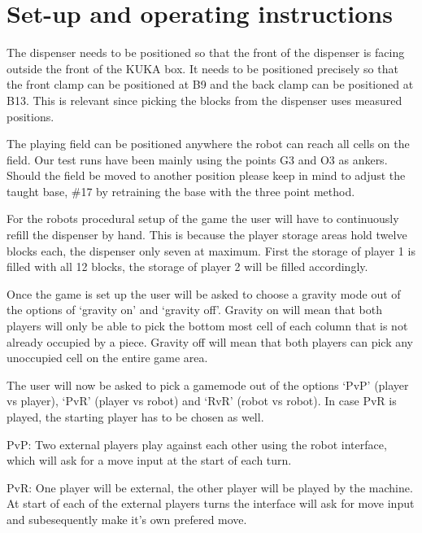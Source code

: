 \documentclass{article}
\begin{document}
    \makeHeader\newpage
    \tableofcontents
    \newpage
    \section{Set-up and operating instructions}
        The dispenser needs to be positioned so that the front of the dispenser is facing outside the front of the KUKA box. It needs to be positioned precisely so that the front clamp can be positioned at B9 and the back clamp can be positioned at B13. This is relevant since picking the blocks from the dispenser uses measured positions.
        
        The playing field can be positioned anywhere the robot can reach all cells on the field. Our test runs have been mainly using the points G3 and O3 as ankers. Should the field be moved to another position please keep in mind to adjust the taught base, \#17 by retraining the base with the three point method. 

        For the robots procedural setup of the game the user will have to continuously refill the dispenser by hand. This is because the player storage areas hold twelve blocks each, the dispenser only seven at maximum. First the storage of player 1 is filled with all 12 blocks, the storage of player 2 will be filled accordingly.

        Once the game is set up the user will be asked to choose a gravity mode out of the options of `gravity on' and `gravity off'. Gravity on will mean that both players will only be able to pick the bottom most cell of each column that is not already occupied by a piece. Gravity off will mean that both players can pick any unoccupied cell on the entire game area.

        The user will now be asked to pick a gamemode out of the options `PvP' (player vs player), `PvR' (player vs robot) and `RvR' (robot vs robot). In case PvR is played, the starting player has to be chosen as well.

        
        PvP\@: Two external players play against each other using the robot interface, which will ask for a move input at the start of each turn. 
        
        PvR\@: One player will be external, the other player will be played by the machine. At start of each of the external players turns the interface will ask for move input and subesequently make it's own prefered move.
        
\end{document}
